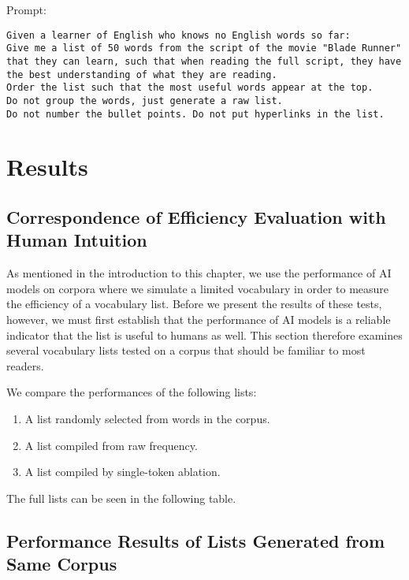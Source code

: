 Prompt:

\begin{lstlisting}[caption={Prompt given to the language model.}, label={lst:blade_runner_prompt}, captionpos=b]
	Given a learner of English who knows no English words so far:
Give me a list of 50 words from the script of the movie "Blade Runner" that they can learn, such that when reading the full script, they have the best understanding of what they are reading.
Order the list such that the most useful words appear at the top.
Do not group the words, just generate a raw list.
Do not number the bullet points. Do not put hyperlinks in the list.

\end{lstlisting}

\section{Results} \label{sec:results}

\subsection{Correspondence of Efficiency Evaluation with Human Intuition}
As mentioned in the introduction to this chapter, we use the performance of AI models on corpora where we simulate a limited vocabulary in order to measure the efficiency of a vocabulary list.
Before we present the results of these tests, however, we must first establish that the performance of AI models is a reliable indicator that the list is useful to humans as well.
This section therefore examines several vocabulary lists tested on a corpus that should be familiar to most readers.

We compare the performances of the following lists:
\begin{enumerate}
	\item A list randomly selected from words in the corpus.
	\item A list compiled from raw frequency.
	\item A list compiled by single-token ablation.
\end{enumerate}

The full lists can be seen in the following table.

\subsection{Performance Results of Lists Generated from Same Corpus} \label{sec:results-same-corpus}

